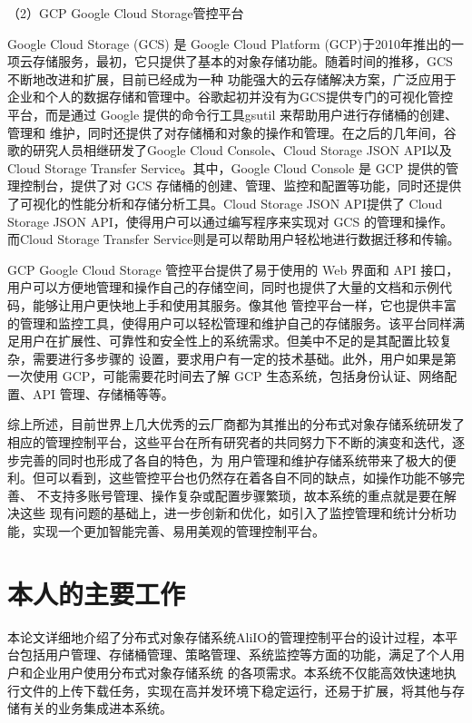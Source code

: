 （2）GCP Google Cloud Storage管控平台

Google Cloud Storage (GCS) 是 Google Cloud Platform (GCP)于2010年推出的一项云存储服务，最初，它只提供了基本的对象存储功能。随着时间的推移，GCS 不断地改进和扩展，目前已经成为一种
功能强大的云存储解决方案，广泛应用于企业和个人的数据存储和管理中。谷歌起初并没有为GCS提供专门的可视化管控平台，而是通过 Google 提供的命令行工具gsutil 来帮助用户进行存储桶的创建、管理和
维护，同时还提供了对存储桶和对象的操作和管理。在之后的几年间，谷歌的研究人员相继研发了Google Cloud Console、Cloud Storage JSON API以及Cloud Storage Transfer Service。其中，Google 
Cloud Console 是 GCP 提供的管理控制台，提供了对 GCS 存储桶的创建、管理、监控和配置等功能，同时还提供了可视化的性能分析和存储分析工具。Cloud Storage JSON API提供了 Cloud Storage 
JSON API，使得用户可以通过编写程序来实现对 GCS 的管理和操作。而Cloud Storage Transfer Service则是可以帮助用户轻松地进行数据迁移和传输。

GCP Google Cloud Storage 管控平台提供了易于使用的 Web 界面和 API 接口，用户可以方便地管理和操作自己的存储空间，同时也提供了大量的文档和示例代码，能够让用户更快地上手和使用其服务。像其他
管控平台一样，它也提供丰富的管理和监控工具，使得用户可以轻松管理和维护自己的存储服务。该平台同样满足用户在扩展性、可靠性和安全性上的系统需求。但美中不足的是其配置比较复杂，需要进行多步骤的
设置，要求用户有一定的技术基础。此外，用户如果是第一次使用 GCP，可能需要花时间去了解 GCP 生态系统，包括身份认证、网络配置、API 管理、存储桶等等。

综上所述，目前世界上几大优秀的云厂商都为其推出的分布式对象存储系统研发了相应的管理控制平台，这些平台在所有研究者的共同努力下不断的演变和迭代，逐步完善的同时也形成了各自的特色，为
用户管理和维护存储系统带来了极大的便利。但可以看到，这些管控平台也仍然存在着各自不同的缺点，如操作功能不够完善、 不支持多账号管理、操作复杂或配置步骤繁琐，故本系统的重点就是要在解决这些
现有问题的基础上，进一步创新和优化，如引入了监控管理和统计分析功能，实现一个更加智能完善、易用美观的管理控制平台。

\section{本人的主要工作}

本论文详细地介绍了分布式对象存储系统AliIO的管理控制平台的设计过程，本平台包括用户管理、存储桶管理、策略管理、系统监控等方面的功能，满足了个人用户和企业用户使用分布式对象存储系统
的各项需求。本系统不仅能高效快速地执行文件的上传下载任务，实现在高并发环境下稳定运行，还易于扩展，将其他与存储有关的业务集成进本系统。

